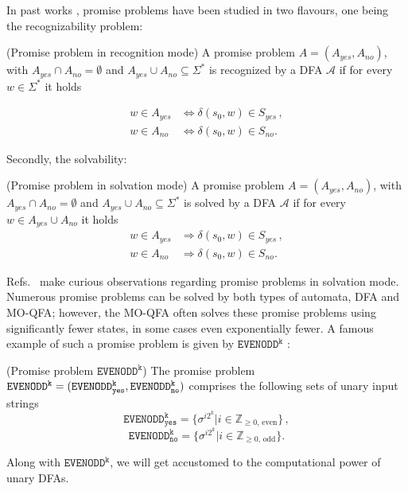 \documentclass[../main.tex]{subfiles}
\begin{document}
In past works \cite{zheng2017promise}, promise problems have been studied in two flavours, one being the recognizability problem:
\begin{definition} (Promise problem in recognition mode)
        A promise problem $A = (A_{yes}, A_{no})$, with $A_{yes} \cap A_{no} = \emptyset$ and $A_{yes} \cup A_{no} \subseteq \Sigma^*$ is recognized by a DFA $\mathcal{A}$ if for every $w \in \Sigma^* $ it holds

        \begin{align}
            w \in A_{yes} &\iff \delta(s_0, w) \in S_{yes} \, , \\
            w \in A_{no} &\iff \delta(s_0, w) \in S_{no} .
        \end{align}
\end{definition}
Secondly, the solvability:
\begin{definition} (Promise problem in solvation mode)
    A promise problem $A = (A_{yes}, A_{no})$, with $A_{yes} \cap A_{no} = \emptyset$ and $A_{yes} \cup A_{no} \subseteq \Sigma^*$ is solved by a DFA $\mathcal{A}$ if for every $w \in A_{yes} \cup A_{no} $ it holds
        \begin{align}
            w \in A_{yes} &\Rightarrow \delta(s_0, w) \in S_{yes} \, , \\
            w \in A_{no} &\Rightarrow \delta(s_0, w) \in S_{no} .
        \end{align}
\end{definition}

Refs.~\cite {ambainis2012superiority,zheng2017promise} make curious observations regarding promise problems in solvation mode. Numerous promise problems can be solved by both types of automata, \ac{DFA} and \ac{MO-QFA}; however, the \ac{MO-QFA} often solves these promise problems using significantly fewer states, in some cases even exponentially fewer.
A famous example of such a promise problem is given by $\mathtt{EVENODD^k}$ \cite{ambainis2012superiority, rashid2014implications}:
\begin{definition} \label{def:evenodd} (Promise problem $\mathtt{EVENODD^k}$)
    The promise problem $\mathtt{EVENODD^k} = \\ (\mathtt{EVENODD^k_{yes}}, \mathtt{EVENODD^k_{no}})$ comprises the following sets of unary input strings
    \begin{equation}
        \mathtt{EVENODD^k_{yes}} = \{ \sigma^{i2^k} | i \in \mathbb{Z}_{\geq 0,\,\mathrm{even}} \} \, ,
    \end{equation}
    \begin{equation}
        \mathtt{EVENODD^k_{no}} = \{ \sigma^{i2^k} | i \in \mathbb{Z}_{\geq 0,\,\mathrm{odd}} \} .
    \end{equation}
\end{definition}
Along with $\mathtt{EVENODD^k}$, we will get accustomed to the computational power of unary DFAs.
\end{document}
